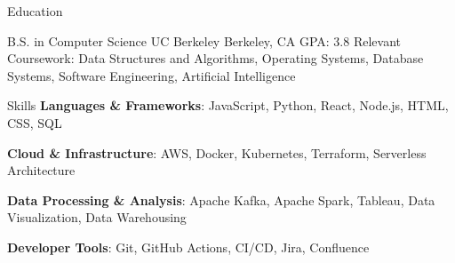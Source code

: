 \documentclass[a4paper,11pt,english]{curve}
\begin{document}
\begin{rubric}{Education}
\begin{eventlist}
{B.S. in Computer Science}
{UC Berkeley}
{Berkeley, CA}
{GPA: 3.8
Relevant Coursework: Data Structures and Algorithms, Operating Systems, Database Systems, Software Engineering, Artificial Intelligence}
\end{eventlist}
\end{rubric}

\begin{rubric}{Skills}
\textbf{Languages \& Frameworks}: JavaScript, Python, React, Node.js, HTML, CSS, SQL

\textbf{Cloud \& Infrastructure}: AWS, Docker, Kubernetes, Terraform, Serverless Architecture

\textbf{Data Processing \& Analysis}: Apache Kafka, Apache Spark, Tableau, Data Visualization, Data Warehousing

\textbf{Developer Tools}: Git, GitHub Actions, CI/CD, Jira, Confluence
\end{rubric}
\end{document}

